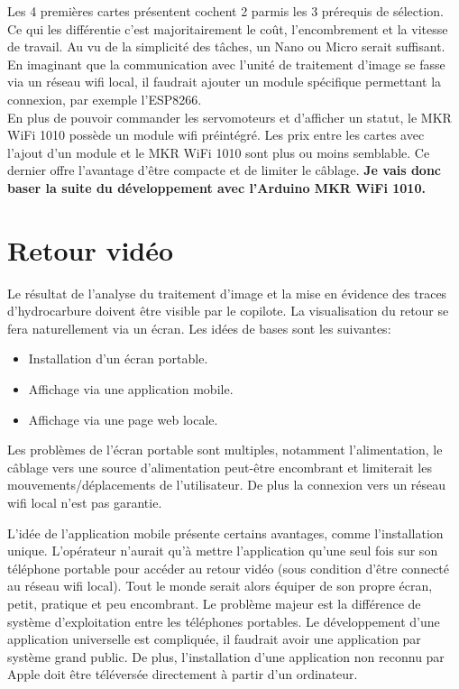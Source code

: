 Les 4 premières cartes présentent cochent 2 parmis les 3 prérequis de sélection. Ce qui les différentie c'est majoritairement le coût, l'encombrement et la vitesse de travail.
Au vu de la simplicité des tâches, un Nano ou Micro serait suffisant. En imaginant que la communication avec l'unité de traitement d'image se fasse via un réseau \Gls{wifi} local,
il faudrait ajouter un module spécifique permettant la connexion, par exemple l'ESP8266.\\
En plus de pouvoir commander les servomoteurs et d'afficher un statut, le MKR WiFi 1010 possède un module \Gls{wifi} préintégré.
Les prix entre les cartes avec l'ajout d'un module et le MKR WiFi 1010 sont plus ou moins semblable. Ce dernier offre l'avantage d'être compacte et de limiter le câblage.
\textbf{Je vais donc baser la suite du développement avec l'Arduino MKR WiFi 1010.} \cite{MKR}
\section{Retour vidéo}
Le résultat de l'analyse du traitement d'image et la mise en évidence des traces d'hydrocarbure doivent être visible par le copilote.
La visualisation du retour se fera naturellement via un écran. Les idées de bases sont les suivantes:
\begin{itemize}
    \item Installation d'un écran portable.
    \item Affichage via une application mobile.
    \item Affichage via une page web locale.
\end{itemize}

Les problèmes de l'écran portable sont multiples, notamment l'alimentation, le câblage vers une source d'alimentation peut-être encombrant
et limiterait les mouvements/déplacements de l'utilisateur. De plus la connexion vers un réseau \Gls{wifi} local n'est pas garantie.

L'idée de l'application mobile présente certains avantages, comme l'installation unique. L'opérateur n'aurait qu'à mettre l'application
qu'une seul fois sur son téléphone portable pour accéder au retour vidéo (sous condition d'être connecté au réseau \Gls{wifi} local).
Tout le monde serait alors équiper de son propre écran, petit, pratique et peu encombrant. Le problème majeur est la différence de système d'exploitation
entre les téléphones portables. Le développement d'une application universelle est compliquée, il faudrait avoir une application par système grand public.
De plus, l'installation d'une application non reconnu par Apple doit être téléversée directement à partir d'un ordinateur.

